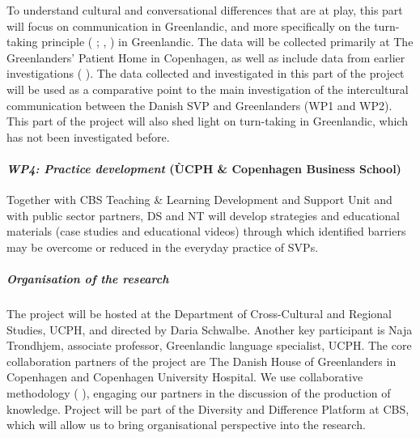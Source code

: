 \documentclass[twocolumn, issue, rga, authordate]{jote-new-article}
\begin{document}
To understand cultural and conversational differences that are at play, this part will focus on communication in Greenlandic, and more specifically on the turn-taking principle ( \citeyear{Tanen2012}; , \citeyear{Steensig2011}) in Greenlandic. The data will be collected primarily at The Greenlanders'
Patient Home in Copenhagen, as well as include data from earlier investigations ( \citeyear{Trondhjem2008}). The data collected and investigated in this part of the project will be used as a comparative point to the main investigation of the intercultural communication between the Danish SVP and Greenlanders (WP1 and WP2). This part of the project will also shed light on turn-taking in Greenlandic, which has not been investigated before.

\paragraph{\emph{WP4: Practice development} (ÙCPH \& Copenhagen Business School)}
Together with CBS Teaching \& Learning Development and Support Unit and with public sector partners, DS and NT will develop strategies and educational materials
(case studies and educational videos) through which identified barriers may be overcome or reduced in the everyday practice of SVPs.

\subparagraph{Organisation of the research}

The project will be hosted at the Department of Cross-Cultural and Regional Studies, UCPH, and directed by Daria Schwalbe. Another key participant is Naja Trondhjem, associate professor, Greenlandic language specialist, UCPH. The core collaboration partners of the project are The Danish House of Greenlanders in Copenhagen and Copenhagen University Hospital. We use collaborative methodology ( \citeyear{Phillips2018}), engaging our partners in the discussion of the production of knowledge. Project will be part of the Diversity and Difference Platform at CBS, which will allow us to bring organisational perspective into the research.
\end{document}
